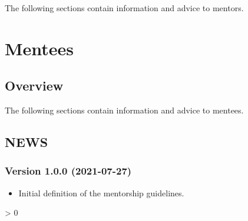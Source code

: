 \documentclass[
]{book}
\providecommand{\tightlist}{%
  \setlength{\itemsep}{0pt}\setlength{\parskip}{0pt}}
\newlength{\cslhangindent}
\newenvironment{CSLReferences}[2] %
 {%
  \setlength{\parindent}{0pt}
  \ifodd #1 \everypar{\setlength{\hangindent}{\cslhangindent}}\ignorespaces\fi
  \ifnum #2 > 0
  \setlength{\parskip}{#2\baselineskip}
  \fi
 }%
 {}
\begin{document}
The following sections contain information and advice to mentors.

\hypertarget{part-mentees}{%
\part{Mentees}\label{part-mentees}}

\hypertarget{mentee-overview}{%
\chapter*{Overview}\label{mentee-overview}}

The following sections contain information and advice to mentees.

\hypertarget{appendix-appendix}{%
\appendix}


\hypertarget{booknews}{%
\chapter{NEWS}\label{booknews}}

\hypertarget{version-1.0.0-2021-07-27}{%
\section{Version 1.0.0 (2021-07-27)}\label{version-1.0.0-2021-07-27}}

\begin{itemize}
\tightlist
\item
  Initial definition of the mentorship guidelines.
\end{itemize}

\hypertarget{refs}{}
\begin{CSLReferences}{0}{0}
\end{CSLReferences}

  
\end{document}
